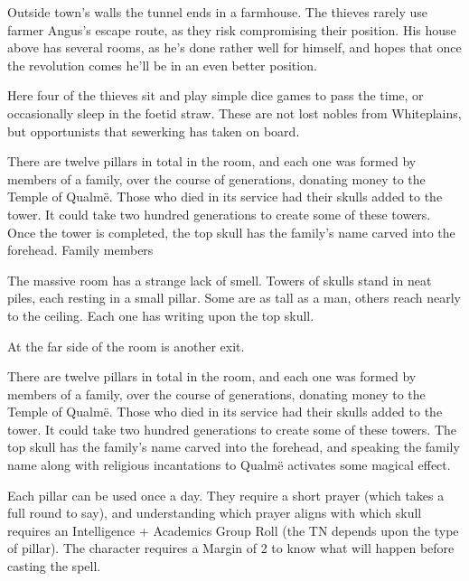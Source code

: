 \begin{multicols}{2}
\begin{boxtext}
\end{boxtext}

Outside \gls{town}'s walls the tunnel ends in a farmhouse.
The thieves rarely use farmer Angus's escape route, as they risk compromising their position.
His house above has several rooms, as he's done rather well for himself, and hopes that once the revolution comes he'll be in an even better position.


Here four of the thieves sit and play simple dice games to pass the time, or occasionally sleep in the foetid straw.
These are not lost nobles from Whiteplains, but opportunists that \gls{sewerking} has taken on board.



There are twelve pillars in total in the room, and each one was formed by members of a family, over the course of generations, donating money to the Temple of Qualm\"{e}.  Those who died in its service had their skulls added to the tower.  It could take two hundred generations to create some of these towers.  Once the tower is completed, the top skull has the family's name carved into the forehead.  Family members

\begin{boxtext}

	The massive room has a strange lack of smell.  Towers of skulls stand in neat piles, each resting in a small pillar.  Some are as tall as a man, others reach nearly to the ceiling.  Each one has writing upon the top skull.

	At the far side of the room is another exit.

\end{boxtext}

There are twelve pillars in total in the room, and each one was formed by members of a family, over the course of generations, donating money to the Temple of Qualm\"{e}.  Those who died in its service had their skulls added to the tower.  It could take two hundred generations to create some of these towers.  The top skull has the family's name carved into the forehead, and speaking the family name along with religious incantations to Qualm\"{e} activates some magical effect.

Each pillar can be used once a day.
They require a short prayer (which takes a full round to say), and understanding which prayer aligns with which skull requires an Intelligence + Academics Group Roll (the TN depends upon the type of pillar).
The character requires a Margin of 2 to know what will happen before casting the spell.


\end{multicols}
